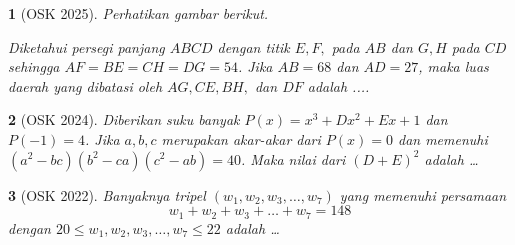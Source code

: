 \documentclass[11pt,a4paper,DIV=12]{scrartcl}
\theoremstyle{justnumber}
\newtheorem{problem}{}
\begin{document}
\begin{problem}[OSK 2025]
  Perhatikan gambar berikut.

  \begin{center}
  \end{center}
  Diketahui persegi panjang $ABCD$ dengan titik $E, F,$ pada $AB$ dan $G, H$ pada $CD$ sehingga $AF = BE = CH = DG = 54$. Jika $AB = 68$ dan $AD = 27$, maka luas daerah yang dibatasi oleh $AG, CE, BH,$ dan $DF$ adalah ....
\end{problem}


\begin{problem}[OSK 2024]
  Diberikan suku banyak $P(x) = x^3 + Dx^2 + Ex + 1$ dan $P(-1) = 4$. Jika $a, b, c$ merupakan akar-akar dari $P(x) = 0$ dan memenuhi $(a^2 - bc)(b^2 - ca)(c^2 - ab) = 40$. Maka nilai dari $(D + E)^2$ adalah \dots
\end{problem}

\begin{problem}[OSK 2022]
  Banyaknya tripel $(w_1, w_2, w_3, \dots, w_7)$ yang memenuhi persamaan
  \[ w_1 + w_2 + w_3 + \dots + w_7 = 148 \]
  dengan $20 \leq w_1, w_2, w_3, \dots, w_7 \leq 22$ adalah \dots
\end{problem}
\end{document}
